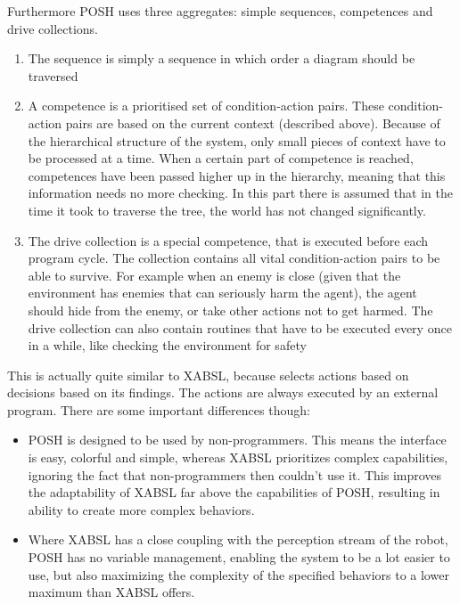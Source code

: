 \documentclass[a4paper,10pt]{article}
\begin{document}
Furthermore POSH uses three aggregates: simple sequences, competences and drive
collections.

\begin{enumerate}
    \item {}
        The sequence is simply a sequence in which order a diagram should be
        traversed
    \item {}
        A competence is a prioritised set of condition-action pairs. These
        condition-action pairs are based on the current context (described
        above). Because of the hierarchical structure of the system, only small
        pieces of context have to be processed at a time. When a certain part of
        competence is reached, competences have been passed higher up in the
        hierarchy, meaning that this information needs no more checking. In this
        part there is assumed that in the time it took to traverse the tree, the
        world has not changed significantly.
    \item {}
        The drive collection is a special competence, that is executed before
        each program cycle. The collection contains all vital condition-action
        pairs to be able to survive. For example when an enemy is close (given
        that the environment has enemies that can seriously harm the agent), the
        agent should hide from the enemy, or take other actions not to get
        harmed. The drive collection can also contain routines that have to be
        executed every once in a while, like checking the environment for safety
\end{enumerate}

This is actually quite similar to XABSL,
because selects actions based on decisions based on its findings. 
The actions are always executed by an external program. There are some important differences though:

\begin{itemize}
    \item POSH is designed to be used by non-pro\-gram\-mers. This means the
    interface is easy, colorful and simple, whereas XABSL prioritizes complex
    capabilities, ignoring the fact that non-programmers then couldn't use it.
    This improves the adaptability of XABSL far above the capabilities of POSH,
    resulting in ability to create more complex behaviors.
    \item Where XABSL has a close coupling with the perception stream of the
    robot, POSH has no variable management, enabling the system to be a lot
    easier to use, but also maximizing the complexity of the specified behaviors
    to a lower maximum than XABSL offers.
\end{itemize}
\end{document}
